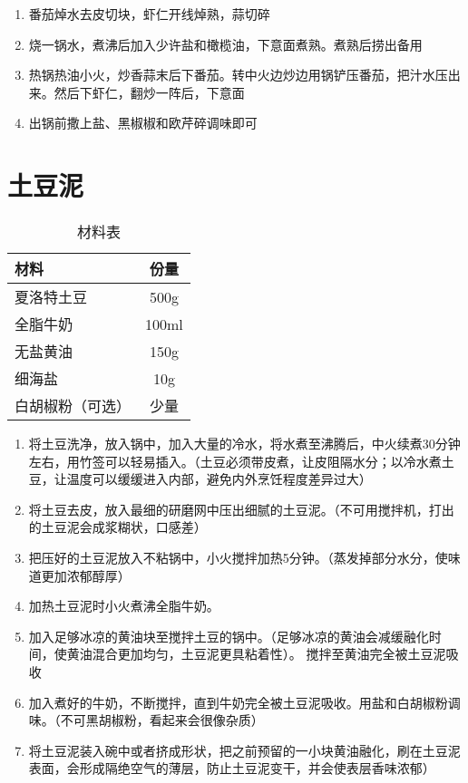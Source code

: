 \begin{enumerate}
    \item 番茄焯水去皮切块，虾仁开线焯熟，蒜切碎
    \item 烧一锅水，煮沸后加入少许盐和橄榄油，下意面煮熟。煮熟后捞出备用
    \item 热锅热油小火，炒香蒜末后下番茄。转中火边炒边用锅铲压番茄，把汁水压出来。然后下虾仁，翻炒一阵后，下意面
    \item 出锅前撒上盐、黑椒椒和欧芹碎调味即可
\end{enumerate}

\section{土豆泥}

\begin{table}[H]
    \centering
    \begin{tabular}{|l||c|}\hline
     \textbf{材料}    &  \textbf{份量}\\ \hline\hline
    夏洛特土豆 & 500g \\ \hline
    全脂牛奶 & 100ml  \\ \hline
    无盐黄油 & 150g  \\ \hline
    细海盐 &  10g \\ \hline
    白胡椒粉（可选） & 少量\\ \hline
    \end{tabular}
    \caption{材料表}
\end{table}

\begin{enumerate}
    \item 将土豆洗净，放入锅中，加入大量的冷水，将水煮至沸腾后，中火续煮30分钟左右，用竹签可以轻易插入。（土豆必须带皮煮，让皮阻隔水分；以冷水煮土豆，让温度可以缓缓进入内部，避免内外烹饪程度差异过大）
    \item 将土豆去皮，放入最细的研磨网中压出细腻的土豆泥。（不可用搅拌机，打出的土豆泥会成浆糊状，口感差）
    \item 把压好的土豆泥放入不粘锅中，小火搅拌加热5分钟。（蒸发掉部分水分，使味道更加浓郁醇厚）
    \item 加热土豆泥时小火煮沸全脂牛奶。
    \item 加入足够冰凉的黄油块至搅拌土豆的锅中。（足够冰凉的黄油会减缓融化时间，使黄油混合更加均匀，土豆泥更具粘着性）。 搅拌至黄油完全被土豆泥吸收
    \item 加入煮好的牛奶，不断搅拌，直到牛奶完全被土豆泥吸收。用盐和白胡椒粉调味。（不可黑胡椒粉，看起来会很像杂质）
    \item 将土豆泥装入碗中或者挤成形状，把之前预留的一小块黄油融化，刷在土豆泥表面，会形成隔绝空气的薄层，防止土豆泥变干，并会使表层香味浓郁）
\end{enumerate}


